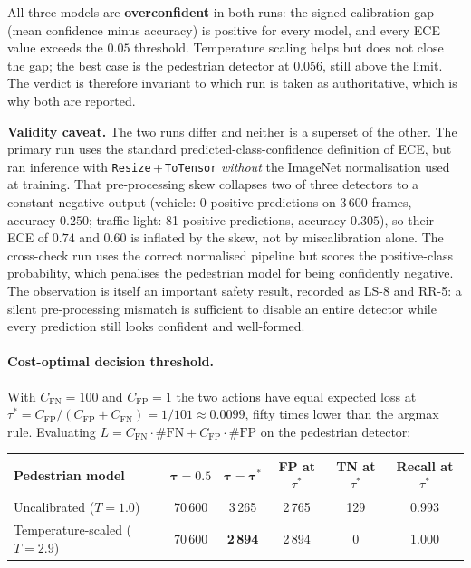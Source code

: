 \documentclass[a4paper,12pt]{article}
\begin{document}
\noindent All three models are \textbf{overconfident} in both runs: the signed calibration
gap (mean confidence minus accuracy) is positive for every model, and every ECE value
exceeds the $0.05$ threshold. Temperature scaling helps but does not close the gap; the
best case is the pedestrian detector at $0.056$, still above the limit. The verdict is
therefore invariant to which run is taken as authoritative, which is why both are reported.

\begin{mdframed}[style=cautionstyle]
\textbf{Validity caveat.} The two runs differ and neither is a superset of the other. The
primary run uses the standard predicted-class-confidence definition of ECE, but ran
inference with \texttt{Resize}\,+\,\texttt{ToTensor} \emph{without} the ImageNet
normalisation used at training. That pre-processing skew collapses two of three detectors
to a constant negative output (vehicle: 0 positive predictions on 3\,600 frames, accuracy
$0.250$; traffic light: 81 positive predictions, accuracy $0.305$), so their ECE of $0.74$
and $0.60$ is inflated by the skew, not by miscalibration alone. The cross-check run uses
the correct normalised pipeline but scores the positive-class probability, which penalises
the pedestrian model for being confidently negative. The observation is itself an important
safety result, recorded as LS-8 and RR-5: a silent pre-processing mismatch is sufficient to
disable an entire detector while every prediction still looks confident and well-formed.
\end{mdframed}

\paragraph{Cost-optimal decision threshold.} With $C_{\text{FN}}=100$ and
$C_{\text{FP}}=1$ the two actions have equal expected loss at
$\tau^{*}=C_{\text{FP}}/(C_{\text{FP}}+C_{\text{FN}})=1/101\approx0.0099$, fifty times
lower than the argmax rule. Evaluating
$L=C_{\text{FN}}\cdot\#\text{FN}+C_{\text{FP}}\cdot\#\text{FP}$ on the pedestrian detector:

\begin{center}
\small
\begin{tabular}{@{}lccccc@{}}
\toprule
\textbf{Pedestrian model} & $\boldsymbol{\tau=0.5}$ & $\boldsymbol{\tau=\tau^{*}}$ &
\textbf{FP at $\tau^{*}$} & \textbf{TN at $\tau^{*}$} & \textbf{Recall at $\tau^{*}$} \\
\midrule
Uncalibrated ($T=1.0$)       & 70\,600 & 3\,265 & 2\,765 & 129 & 0.993 \\
Temperature-scaled ($T=2.9$) & 70\,600 & \textbf{2\,894} & 2\,894 & 0 & 1.000 \\
\bottomrule
\end{tabular}
\end{center}
\end{document}
